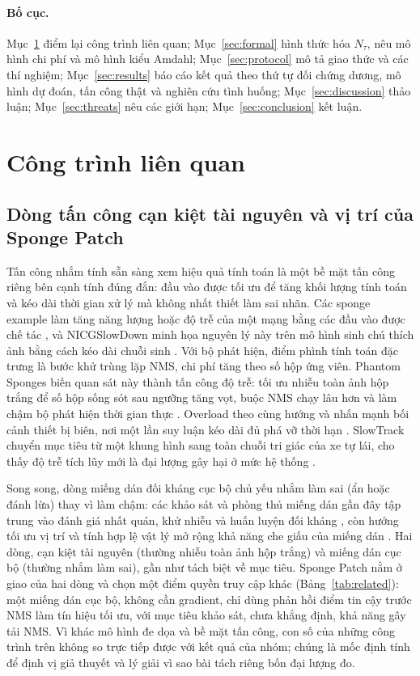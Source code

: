 \documentclass[a4paper,fleqn]{cas-dc}
\newcommand{\Ntau}{N_{\tau}}
\begin{document}
\paragraph{Bố cục.}
Mục~\ref{sec:related} điểm lại công trình liên quan; Mục~\ref{sec:formal} hình thức hóa $\Ntau$, nêu mô hình chi phí và mô hình kiểu Amdahl; Mục~\ref{sec:protocol} mô tả giao thức và các thí nghiệm; Mục~\ref{sec:results} báo cáo kết quả theo thứ tự đối chứng dương, mô hình dự đoán, tấn công thật và nghiên cứu tình huống; Mục~\ref{sec:discussion} thảo luận; Mục~\ref{sec:threats} nêu các giới hạn; Mục~\ref{sec:conclusion} kết luận.

\section{Công trình liên quan}
\label{sec:related}
\subsection{Dòng tấn công cạn kiệt tài nguyên và vị trí của Sponge Patch}
Tấn công nhắm tính sẵn sàng xem hiệu quả tính toán là một bề mặt tấn công riêng bên cạnh tính đúng đắn: đầu vào được tối ưu để tăng khối lượng tính toán và kéo dài thời gian xử lý mà không nhất thiết làm sai nhãn. Các sponge example làm tăng năng lượng hoặc độ trễ của một mạng bằng các đầu vào được chế tác \cite{shumailov2021sponge}, và NICGSlowDown minh họa nguyên lý này trên mô hình sinh chú thích ảnh bằng cách kéo dài chuỗi sinh \cite{nicgslowdown2022}. Với bộ phát hiện, điểm phình tính toán đặc trưng là bước khử trùng lặp NMS, chi phí tăng theo số hộp ứng viên. Phantom Sponges biến quan sát này thành tấn công độ trễ: tối ưu nhiễu toàn ảnh hộp trắng để số hộp sống sót sau ngưỡng tăng vọt, buộc NMS chạy lâu hơn và làm chậm bộ phát hiện thời gian thực \cite{phantom2023}. Overload theo cùng hướng và nhấn mạnh bối cảnh thiết bị biên, nơi một lần suy luận kéo dài đủ phá vỡ thời hạn \cite{overload2024}. SlowTrack chuyển mục tiêu từ một khung hình sang toàn chuỗi tri giác của xe tự lái, cho thấy độ trễ tích lũy mới là đại lượng gây hại ở mức hệ thống \cite{slowtrack2024}.

Song song, dòng miếng dán đối kháng cục bộ chủ yếu nhắm làm sai (ẩn hoặc đánh lừa) thay vì làm chậm: các khảo sát và phòng thủ miếng dán gần đây tập trung vào đánh giá nhất quán, khử nhiễu và huấn luyện đối kháng \cite{apde2025,pbcat2025}, còn hướng tối ưu vị trí và tính hợp lệ vật lý mở rộng khả năng che giấu của miếng dán \cite{iap2025,badpatch2025}. Hai dòng, cạn kiệt tài nguyên (thường nhiễu toàn ảnh hộp trắng) và miếng dán cục bộ (thường nhắm làm sai), gần như tách biệt về mục tiêu. Sponge Patch nằm ở giao của hai dòng và chọn một điểm quyền truy cập khác (Bảng~\ref{tab:related}): một miếng dán cục bộ, không cần gradient, chỉ dùng phản hồi điểm tin cậy trước NMS làm tín hiệu tối ưu, với mục tiêu khảo sát, chưa khẳng định, khả năng gây tải NMS. Vì khác mô hình đe dọa và bề mặt tấn công, con số của những công trình trên không so trực tiếp được với kết quả của nhóm; chúng là mốc định tính để định vị giả thuyết và lý giải vì sao bài tách riêng bốn đại lượng đo.
\end{document}
